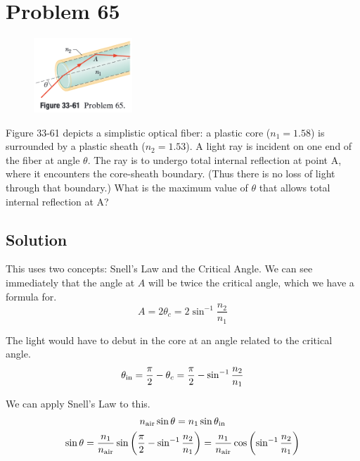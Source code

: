 \documentclass[12pt]{article}
\begin{document}
    \pagebreak
    \section{Problem 65}
        \begin{figure}
            \vspace{-30pt}
            \includegraphics[width=0.33\textwidth]{33-61.png} 
        \end{figure}
        Figure 33-61 depicts a simplistic optical fiber: a plastic core ($n_1 = 1.58$) is surrounded by a plastic sheath ($n_2 = 1.53$). 
        A light ray is incident on one end of the fiber at angle $\theta$. 
        The ray is to undergo total internal reflection at point A, where it encounters the core-sheath boundary. 
        (Thus there is no loss of light through that boundary.) 
        What is the maximum value of $\theta$ that allows total internal reflection at A?

        \subsection{Solution}
            This uses two concepts: Snell's Law and the Critical Angle.
            We can see immediately that the angle at $A$ will be twice the critical angle, which we have a formula for.
            \begin{equation}
                A = 2\theta_c = 2\sin^{-1} \frac{n_2}{n_1}
            \end{equation}

            The light would have to debut in the core at an angle related to the critical angle.
            \begin{gather}
                \theta_{\rm in} = \frac{\pi}{2} - \theta_c
                    =   \frac{\pi}{2} - \sin^{-1} \frac{n_2}{n_1}
            \end{gather}

            We can apply Snell's Law to this.
            \begin{gather}
                n_{\rm air} \sin \theta = n_1 \sin \theta_{\rm in}\\
                \sin \theta =   \frac{n_1}{n_{\rm air}}  \sin \left( \frac{\pi}{2} - \sin^{-1} \frac{n_2}{n_1} \right)
                    =   \frac{n_1}{n_{\rm air}}  \cos \left( \sin^{-1} \frac{n_2}{n_1} \right)
            \end{gather}
\end{document}
